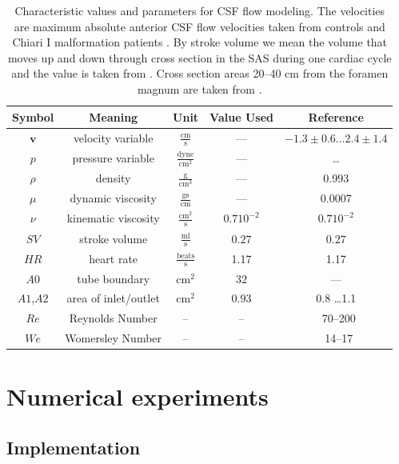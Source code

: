\begin{table}
\center
    \begin{tabular}{ | c | c | c | c | c | }
    \hline
    Symbol & Meaning & Unit & Value Used & Reference \\ \hline\hline
	$\mathbf{v}$	& velocity variable & $\mathrm{ \frac{cm}{s}}$ & --- & $-1.3\pm 0.6 \ldots 2.4 \pm 1.4$  \\
	$p$		& pressure	variable & $\mathrm{\frac{dyne}{cm^2}}$ & --- & \ldots\\
	$\rho$	& density & $\mathrm{\frac{g}{cm^3}}$ & --- &0.993 \\ %
	$\mu$	& dynamic viscosity	&  $\mathrm{\frac{g s}{cm}}$ & --- & 0.0007\\
	$\nu$	& kinematic viscosity & $\mathrm{ \frac{cm^2}{s}}$ & $0.7 10^{-2}$ & $0.7 10^{-2}$ \\ 	\hline %
	$SV$	& stroke volume 	& $\mathrm{ \frac{ml}{s}}$& $0.27$  & $0.27$ \\
	$HR$	& heart rate & $\mathrm{\frac{beats}{s}}$	& 1.17 & 1.17\\
	$A0$	& tube boundary	& $\mathrm{ cm^2}$ & $32$  & ---\\
	$A1$,$A2$	& area of inlet/outlet & $\mathrm{ cm^2}$ &$0.93$ & 0.8 \ldots 1.1   \\
    \hline
    $Re$    & Reynolds Number & -- & -- & ~70--200 \\
    $We$    & Womersley Number & -- & -- & ~14--17 \\
    \hline
    \end{tabular}
\caption{Characteristic values and parameters for CSF flow
modeling.  The velocities are maximum absolute anterior CSF flow
velocities taken from controls and Chiari I malformation patients
\citep{HofmannWarmuth-MetzBendszusEtAl2000}.  By stroke volume
we mean the volume that moves up and down through cross section
in the SAS during one cardiac cycle and the value is taken from
\citep{GuptaSoellingerBoesigerEtAl2009}.  Cross section areas 20--40 cm
from the foramen magnum are taken from \citep{LothYardimciAlperin2001}.}
\label{tab:entities}
\end{table}


\section{Numerical experiments}

\subsection{Implementation}

